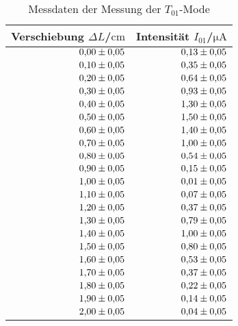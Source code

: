 \begin{table}
 \caption{Messdaten der Messung der $T_{01}$-Mode}
 \label{tab:t01}
 \centering
{} \begin{tabular}{rr}
 \toprule 
    {Verschiebung $\Delta L$/$\si{\centi\meter}$}& {Intensität $I_{\mathrm{01}}$/$\si{\micro\ampere}$} \\
     \midrule
     $\num{0.00 \pm 0.05}$ & $\num{0.13\pm0.05}$ \\
     $\num{0.10 \pm 0.05}$ & $\num{0.35\pm0.05}$ \\
     $\num{0.20 \pm 0.05}$ & $\num{0.64\pm0.05}$ \\
     $\num{0.30 \pm 0.05}$ & $\num{0.93\pm0.05}$ \\
     $\num{0.40 \pm 0.05}$ & $\num{1.30\pm0.05}$ \\
     $\num{0.50 \pm 0.05}$ & $\num{1.50\pm0.05}$ \\
     $\num{0.60 \pm 0.05}$ & $\num{1.40\pm0.05}$ \\
     $\num{0.70 \pm 0.05}$ & $\num{1.00\pm0.05}$ \\
     $\num{0.80 \pm 0.05}$ & $\num{0.54\pm0.05}$ \\
     $\num{0.90 \pm 0.05}$ & $\num{0.15\pm0.05}$ \\
     $\num{1.00 \pm 0.05}$ & $\num{0.01\pm0.05}$ \\
     $\num{1.10 \pm 0.05}$ & $\num{0.07\pm0.05}$ \\
     $\num{1.20 \pm 0.05}$ & $\num{0.37\pm0.05}$ \\
     $\num{1.30 \pm 0.05}$ & $\num{0.79\pm0.05}$ \\
     $\num{1.40 \pm 0.05}$ & $\num{1.00\pm0.05}$ \\
     $\num{1.50 \pm 0.05}$ & $\num{0.80\pm0.05}$ \\
     $\num{1.60 \pm 0.05}$ & $\num{0.53\pm0.05}$ \\
     $\num{1.70 \pm 0.05}$ & $\num{0.37\pm0.05}$ \\
     $\num{1.80 \pm 0.05}$ & $\num{0.22\pm0.05}$ \\
     $\num{1.90 \pm 0.05}$ & $\num{0.14\pm0.05}$ \\
     $\num{2.00 \pm 0.05}$ & $\num{0.04\pm0.05}$ \\
 \bottomrule
 \end{tabular}
\end{table}